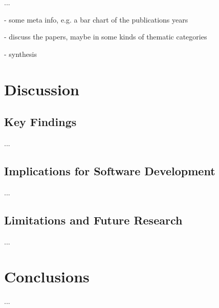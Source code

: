 \documentclass[sigconf]{acmart}
\begin{document}
	...

	- some meta info, e.g. a bar chart of the publications years

	- discuss the papers, maybe in some kinds of thematic categories

	- synthesis

	\section{Discussion}

	\subsection{Key Findings}

	...

	\subsection{Implications for Software Development}

	...

	\subsection{Limitations and Future Research}

	...

	\section{Conclusions}

	...




	
	
\end{document}
